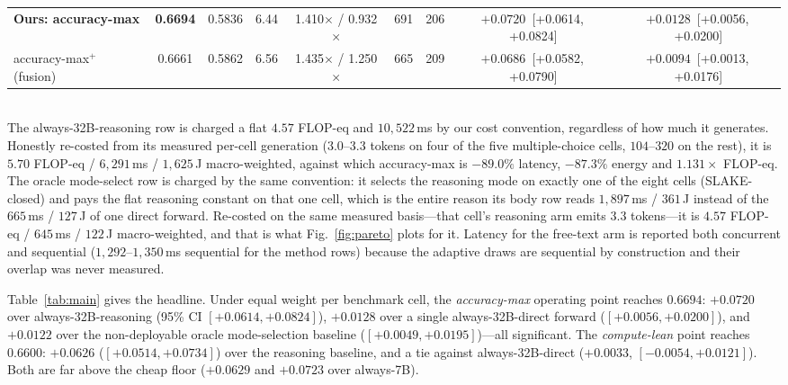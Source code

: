 \documentclass[conference]{IEEEtran}
\newcommand{\ci}[2]{{\footnotesize[#1,\,#2]}}
\begin{document}
\begin{table}[t]
\begin{tabular}{@{}lcccccccc@{}}
\textbf{Ours: accuracy-max}      & \textbf{0.6694} & 0.5836 & 6.44 & 1.410$\times$ / 0.932$\times$ & 691 & 206 & $\mathbf{+0.0720}$~\ci{+0.0614}{+0.0824} & $\mathbf{+0.0128}$~\ci{+0.0056}{+0.0200} \\
\;\;accuracy-max$^{+}$ (fusion)  & 0.6661 & 0.5862 & 6.56 & 1.435$\times$ / 1.250$\times$ & 665 & 209 & $+0.0686$~\ci{+0.0582}{+0.0790} & $+0.0094$~\ci{+0.0013}{+0.0176} \\
\bottomrule
\end{tabular}
\\[2pt]{\scriptsize The always-32B-reasoning row is charged a flat $4.57$ FLOP-eq and $10{,}522$\,ms by our cost convention, regardless of how much it generates. Honestly re-costed from its measured per-cell generation ($3.0$--$3.3$ tokens on four of the five multiple-choice cells, $104$--$320$ on the rest), it is $5.70$ FLOP-eq / $6{,}291$\,ms / $1{,}625$\,J macro-weighted, against which accuracy-max is $-89.0\%$ latency, $-87.3\%$ energy and $1.131{\times}$ FLOP-eq. The oracle mode-select row is charged by the same convention: it selects the reasoning mode on exactly one of the eight cells (SLAKE-closed) and pays the flat reasoning constant on that one cell, which is the entire reason its body row reads $1{,}897$\,ms / $361$\,J instead of the $665$\,ms / $127$\,J of one direct forward. Re-costed on the same measured basis---that cell's reasoning arm emits $3.3$ tokens---it is $4.57$ FLOP-eq / $645$\,ms / $122$\,J macro-weighted, and that is what Fig.~\ref{fig:pareto} plots for it. Latency for the free-text arm is reported both concurrent and sequential ($1{,}292$--$1{,}350$\,ms sequential for the method rows) because the adaptive draws are sequential by construction and their overlap was never measured.}
\end{table}

Table~\ref{tab:main} gives the headline. Under equal weight per benchmark cell, the \emph{accuracy-max} operating point reaches $0.6694$: $+0.0720$ over always-32B-reasoning (95\% CI $[+0.0614,+0.0824]$), $+0.0128$ over a single always-32B-direct forward ($[+0.0056,+0.0200]$), and $+0.0122$ over the non-deployable oracle mode-selection baseline ($[+0.0049,+0.0195]$)---all significant. The \emph{compute-lean} point reaches $0.6600$: $+0.0626$ ($[+0.0514,+0.0734]$) over the reasoning baseline, and a tie against always-32B-direct ($+0.0033$, $[-0.0054,+0.0121]$). Both are far above the cheap floor ($+0.0629$ and $+0.0723$ over always-7B).
\end{document}
